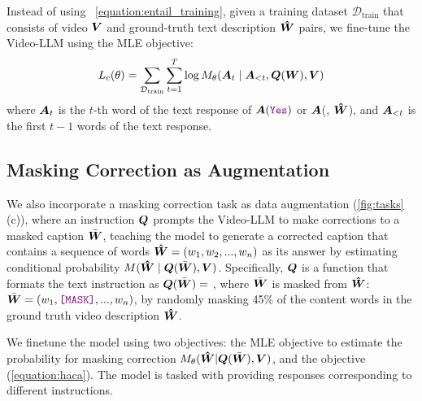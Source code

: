Instead of using ~\autoref{equation:entail_training}, given a training dataset $\mathcal{D}_{\textrm{train}}$ that consists of video $\boldsymbol{V}$ and ground-truth text description $\boldsymbol{\hat{W}}$ pairs,
we fine-tune the Video-LLM using the MLE objective:
\begin{equation}
 L_{c}(\theta) = \sum_{\mathcal{D}_{\textrm{train}}} \sum_{t=1}^{T} \log M_{\theta} (\boldsymbol{A}_t \mid \boldsymbol{A}_{<t}, \boldsymbol{Q}(\boldsymbol{W}), \boldsymbol{V})
 \label{equation:haca}
\end{equation}
where $\boldsymbol{A}_t$ is the $t$-th word of the text response of $\boldsymbol{A}(\textcolor{violet}{\texttt{Yes}})$ or $\boldsymbol{A}$(, $\boldsymbol{\hat{W}}$), and $\boldsymbol{A}_{<t}$ is the first $t - 1$ words of the text response.


\subsection{Masking Correction as Augmentation}
\label{sec:masking_correction}

We also incorporate a masking correction task as data augmentation (\autoref{fig:tasks} (c)),
where an instruction $\boldsymbol{Q}$ prompts the Video-LLM to make corrections to a masked caption $\bar{\boldsymbol{W}}$, teaching the model to generate a corrected caption that contains a sequence of words $\boldsymbol{\hat{W}}=(w_1, w_2, ..., w_n)$ as its answer
by estimating conditional probability $M(\boldsymbol{\hat{W}} \mid \boldsymbol{Q}(\bar{\boldsymbol{W}}), \boldsymbol{V})$.
Specifically, $\boldsymbol{Q}$ is a function that formats the text instruction as 
$\boldsymbol{Q}(\bar{\boldsymbol{W}}) = $ ,
where $\bar{\boldsymbol{W}}$ is masked from $\boldsymbol{\hat{W}}$: $\bar{\boldsymbol{W}} = (w_1, \textcolor{violet}{\texttt{[MASK]}}, ..., w_n )$, by randomly masking 45\% of the content words in the ground truth video description $\boldsymbol{\hat{W}}$. 

We finetune the model using two objectives: the MLE objective to estimate the probability for masking correction $M_\theta(\boldsymbol{\hat{W}}| \boldsymbol{Q}(\bar{\boldsymbol{W}}), \boldsymbol{V})$, and the \method{} objective (\autoref{equation:haca}).
The model is tasked with providing responses corresponding to different instructions. 

